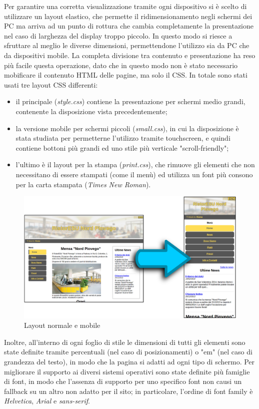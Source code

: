 \documentclass[10pt,a4paper,onecolumn]{article}
\begin{document}
Per garantire una corretta visualizzazione tramite ogni dispositivo si è scelto di utilizzare un layout elastico, che permette il ridimensionamento negli schermi dei PC ma arriva ad un punto di rottura che cambia completamente la presentazione nel caso di larghezza del display troppo piccolo. In questo modo si riesce a sfruttare al meglio le diverse dimensioni, permettendone l'utilizzo sia da PC che da dispositivi mobile.
La completa divisione tra contenuto e presentazione ha reso più facile questa operazione, dato che in questo modo non è stato necessario mobificare il contenuto HTML delle pagine, ma solo il CSS.
In totale sono stati usati tre layout CSS differenti:
\begin{itemize}
 \item il principale (\textit{style.css}) contiene la presentazione per schermi medio grandi, contenente la disposizione vista precedentemente;
 \item la versione mobile per schermi piccoli (\textit{small.css}), in cui la disposizione è stata studiata per permetterne l'utilizzo tramite touchscreen, e quindi contiene bottoni più grandi ed uno stile più verticale "scroll-friendly";
 \item l'ultimo è il layout per la stampa (\textit{print.css}), che rimuove gli elementi che non necessitano di essere stampati (come il menù) ed utilizza un font più consono per la carta stampata (\textit{Times New Roman}).
\end{itemize}

\begin{figure}[h]
\centering
\includegraphics[scale=0.20]{trasformazione}
\caption{Layout normale e mobile}
\label{trasformazioneMobile}
\end{figure}

Inoltre, all'interno di ogni foglio di stile le dimensioni di tutti gli elementi sono state definite tramite percentuali (nel caso di posizionamenti) o "em" (nel caso di grandezza del testo), in modo che la pagina si adatti ad ogni tipo di schermo.
Per migliorare il supporto ai diversi sistemi operativi sono state definite più famiglie di font, in modo che l'assenza di supporto per uno specifico font non causi un fallback su un altro non adatto per il sito; in particolare, l'ordine di font family è \textit{Helvetica}, \textit{Arial} e \textit{sans-serif}.
\end{document}

